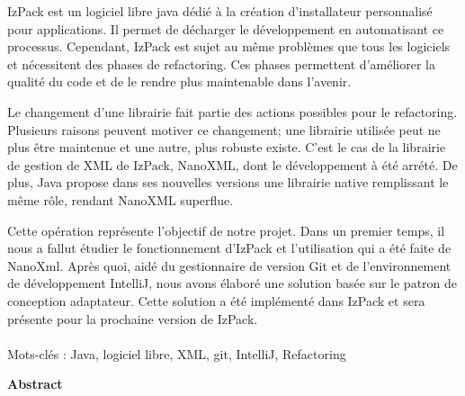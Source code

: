 IzPack est un logiciel libre java dédié à la création d'installateur personnalisé pour applications.
Il permet de décharger le développement en automatisant ce processus.
Cependant, IzPack est sujet au même problèmes que tous les logiciels et nécessitent des phases de refactoring.
Ces phases permettent d'améliorer la qualité du code et de le rendre plus maintenable dans l'avenir.

Le changement d'une librairie fait partie des actions possibles pour le refactoring.
Plusieurs raisons peuvent motiver ce changement; une librairie utilisée peut ne plus être maintenue et une autre, plus robuste existe.
C'est le cas de la librairie de gestion de XML de IzPack, NanoXML, dont le développement à été arrété. 
De plus, Java propose dans ses nouvelles versions une librairie native remplissant le même rôle, rendant NanoXML superflue.

Cette opération représente l'objectif de notre projet. 
Dans un premier temps, il nous a fallut étudier le fonctionnement d'IzPack et l'utilisation qui a été faite de NanoXml.
Après quoi, aidé du gestionnaire de version Git et de l'environnement de développement IntelliJ, nous avons élaboré une solution basée sur le patron de conception adaptateur.
Cette solution a été implémenté dans IzPack et sera présente pour la prochaine version de IzPack.
~\\
~\\
Mots-clés : Java, logiciel libre, XML, git, IntelliJ, Refactoring
\vfill
\begin{center}\large{\textbf{Abstract}}\end{center}

% 

